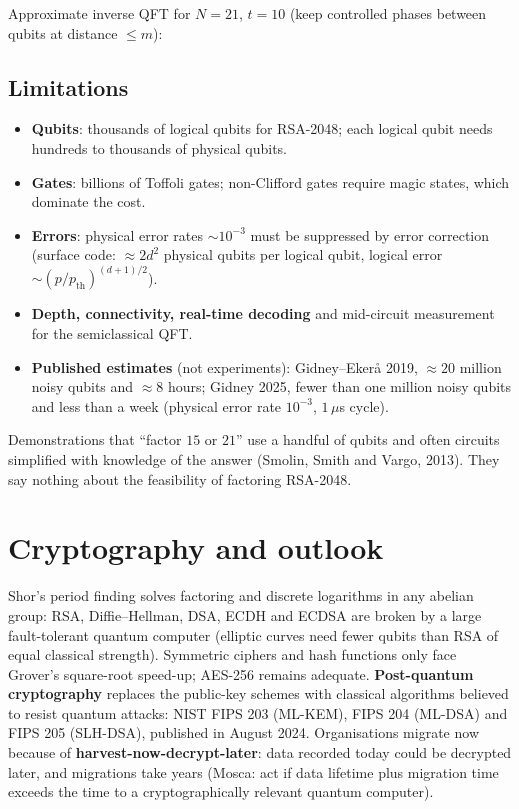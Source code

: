 \documentclass[11pt,a4paper,openany]{book}
\begin{document}
Approximate inverse QFT for $N = 21$, $t = 10$ (keep controlled phases between qubits at distance $\le m$):
\begin{center}\end{center}

\subsection{Limitations}
\begin{itemize}[itemsep=2pt]
\item \textbf{Qubits}: thousands of logical qubits for RSA-2048; each logical qubit needs hundreds to thousands of physical qubits.
\item \textbf{Gates}: billions of Toffoli gates; non-Clifford gates require magic states, which dominate the cost.
\item \textbf{Errors}: physical error rates $\sim10^{-3}$ must be suppressed by error correction (surface code: $\approx2d^2$ physical qubits per logical qubit,
      logical error $\sim(p/p_{\text{th}})^{(d+1)/2}$).
\item \textbf{Depth, connectivity, real-time decoding} and mid-circuit measurement for the semiclassical QFT.
\item \textbf{Published estimates} (not experiments): Gidney--Ekerå 2019, $\approx20$ million noisy qubits and $\approx8$ hours; Gidney 2025, fewer than one
      million noisy qubits and less than a week (physical error rate $10^{-3}$, $1\,\mu$s cycle).
\end{itemize}
\begin{trap}
Demonstrations that ``factor $15$ or $21$'' use a handful of qubits and often circuits simplified with knowledge of the answer (Smolin, Smith and Vargo, 2013).
They say nothing about the feasibility of factoring RSA-2048.
\end{trap}

\section{Cryptography and outlook}
Shor's period finding solves factoring and discrete logarithms in any abelian group: RSA, Diffie--Hellman, DSA, ECDH and ECDSA are broken by a large
fault-tolerant quantum computer (elliptic curves need fewer qubits than RSA of equal classical strength). Symmetric ciphers and hash functions only face
Grover's square-root speed-up; AES-256 remains adequate. \textbf{Post-quantum cryptography} replaces the public-key schemes with classical algorithms
believed to resist quantum attacks: NIST FIPS 203 (ML-KEM), FIPS 204 (ML-DSA) and FIPS 205 (SLH-DSA), published in August 2024. Organisations migrate now
because of \textbf{harvest-now-decrypt-later}: data recorded today could be decrypted later, and migrations take years (Mosca: act if data lifetime plus
migration time exceeds the time to a cryptographically relevant quantum computer).
\end{document}
